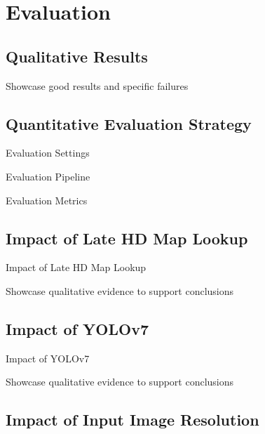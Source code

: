 
\chapter{Evaluation}
\label{ch:evaluation}

\section{Qualitative Results}
\label{sec:qualres}

Showcase good results and specific failures

\newpage


\section{Quantitative Evaluation Strategy}
\label{sec:quant}

Evaluation Settings \par
Evaluation Pipeline \par
Evaluation Metrics

\newpage


\section{Impact of Late HD Map Lookup}
\label{sec:impactlatemap}

Impact of Late HD Map Lookup

Showcase qualitative evidence to support conclusions

\newpage


\section{Impact of YOLOv7}
\label{sec:impactyolov7}

Impact of YOLOv7

Showcase qualitative evidence to support conclusions

\newpage


\section{Impact of Input Image Resolution}
\label{sec:impactresolution}

